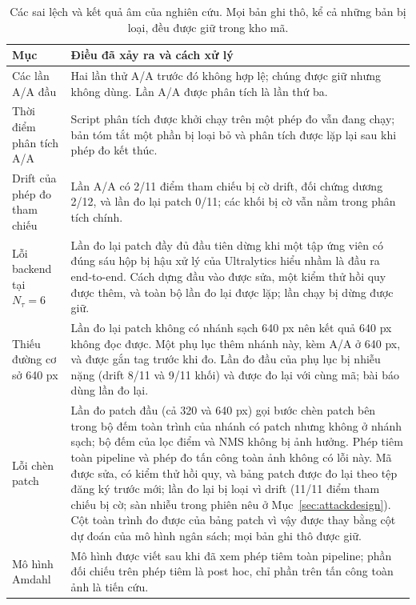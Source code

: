\documentclass[12pt,a4paper]{article}
\newcommand{\Ntau}{N_{\tau}}
\begin{document}
\begin{table}[t]
\centering\small
\caption{Các sai lệch và kết quả âm của nghiên cứu. Mọi bản ghi thô, kể cả những bản bị loại, đều được giữ trong kho mã.}
\label{tab:dev}
\begin{tabularx}{\textwidth}{@{}lX@{}}
\toprule
Mục & Điều đã xảy ra và cách xử lý \\
\midrule
Các lần A/A đầu & Hai lần thử A/A trước đó không hợp lệ; chúng được giữ nhưng không dùng. Lần A/A được phân tích là lần thứ ba. \\
Thời điểm phân tích A/A & Script phân tích được khởi chạy trên một phép đo vẫn đang chạy; bản tóm tắt một phần bị loại bỏ và phân tích được lặp lại sau khi phép đo kết thúc. \\
Drift của phép đo tham chiếu & Lần A/A có 2/11 điểm tham chiếu bị cờ drift, đối chứng dương 2/12, và lần đo lại patch 0/11; các khối bị cờ vẫn nằm trong phân tích chính. \\
Lỗi backend tại $\Ntau=6$ & Lần đo lại patch đầy đủ đầu tiên dừng khi một tập ứng viên có đúng sáu hộp bị hậu xử lý của Ultralytics hiểu nhầm là đầu ra end-to-end. Cách dựng đầu vào được sửa, một kiểm thử hồi quy được thêm, và toàn bộ lần đo lại được lặp; lần chạy bị dừng được giữ. \\
Thiếu đường cơ sở 640 px & Lần đo lại patch không có nhánh sạch 640 px nên kết quả 640 px không đọc được. Một phụ lục thêm nhánh này, kèm A/A ở 640 px, và được gắn tag trước khi đo. Lần đo đầu của phụ lục bị nhiễu nặng (drift 8/11 và 9/11 khối) và được đo lại với cùng mã; bài báo dùng lần đo lại. \\
Lỗi chèn patch & Lần đo patch đầu (cả 320 và 640 px) gọi bước chèn patch bên trong bộ đếm toàn trình của nhánh có patch nhưng không ở nhánh sạch; bộ đếm của lọc điểm và NMS không bị ảnh hưởng. Phép tiêm toàn pipeline và phép đo tấn công toàn ảnh không có lỗi này. Mã được sửa, có kiểm thử hồi quy, và bảng patch được đo lại theo tệp đăng ký trước mới; lần đo lại bị loại vì drift (11/11 điểm tham chiếu bị cờ; sàn nhiễu trong phiên nêu ở Mục~\ref{sec:attackdesign}). Cột toàn trình đo được của bảng patch vì vậy được thay bằng cột dự đoán của mô hình ngân sách; mọi bản ghi thô được giữ. \\
Mô hình Amdahl & Mô hình được viết sau khi đã xem phép tiêm toàn pipeline; phần đối chiếu trên phép tiêm là post hoc, chỉ phần trên tấn công toàn ảnh là tiến cứu. \\
\bottomrule
\end{tabularx}
\end{table}
\end{document}
